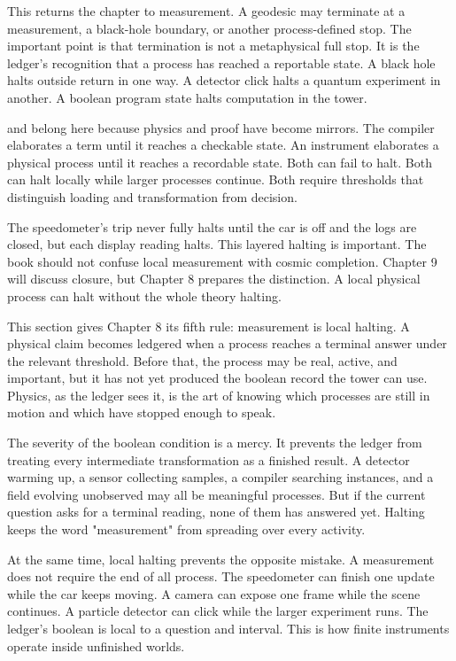 This returns the chapter to measurement. A geodesic may terminate at a
measurement, a black-hole boundary, or another process-defined stop. The
important point is that termination is not a metaphysical full stop. It is the
ledger's recognition that a process has reached a reportable state. A black
hole halts outside return in one way. A detector click halts a quantum
experiment in another. A boolean program state halts computation in the tower.

 and  belong here because physics and
proof have become mirrors. The compiler elaborates a term until it reaches a
checkable state. An instrument elaborates a physical process until it reaches a
recordable state. Both can fail to halt. Both can halt locally while larger
processes continue. Both require thresholds that distinguish loading and
transformation from decision.

The speedometer's trip never fully halts until the car is off and the logs are
closed, but each display reading halts. This layered halting is important. The
book should not confuse local measurement with cosmic completion. Chapter 9
will discuss closure, but Chapter 8 prepares the distinction. A local physical
process can halt without the whole theory halting.

This section gives Chapter 8 its fifth rule: measurement is local halting. A
physical claim becomes ledgered when a process reaches a terminal answer under
the relevant threshold. Before that, the process may be real, active, and
important, but it has not yet produced the boolean record the tower can use.
Physics, as the ledger sees it, is the art of knowing which processes are still
in motion and which have stopped enough to speak.

The severity of the boolean condition is a mercy. It prevents the ledger from
treating every intermediate transformation as a finished result. A detector
warming up, a sensor collecting samples, a compiler searching instances, and a
field evolving unobserved may all be meaningful processes. But if the current
question asks for a terminal reading, none of them has answered yet. Halting
keeps the word "measurement" from spreading over every activity.

At the same time, local halting prevents the opposite mistake. A measurement
does not require the end of all process. The speedometer can finish one update
while the car keeps moving. A camera can expose one frame while the scene
continues. A particle detector can click while the larger experiment runs. The
ledger's boolean is local to a question and interval. This is how finite
instruments operate inside unfinished worlds.

